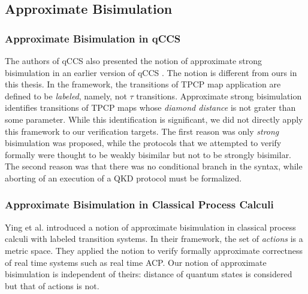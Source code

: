 \subsection{Approximate Bisimulation}
\subsubsection{Approximate Bisimulation in qCCS}
The authors of qCCS also presented the notion of approximate
strong bisimulation in an earlier version of qCCS \cite{Ying2009}.
The notion is different from ours in this thesis.
In the framework, the transitions of TPCP map application are
defined to be {\it labeled}, namely, not $\tau$ transitions.
Approximate strong bisimulation identifies transitions of TPCP maps
whose {\it diamond distance} is not grater than some parameter.
While this identification is significant,
we did not directly apply this framework to our verification targets.
The first reason was only {\it strong} bisimulation was proposed,
while the protocols that we attempted to verify formally were thought
to be weakly bisimilar but not to be strongly bisimilar.
The second reason was that there was no conditional branch in the syntax,
while aborting of an execution of a QKD protocol must be formalized.

\subsubsection{Approximate Bisimulation in Classical Process Calculi}
Ying et al. introduced a notion of approximate bisimulation in
classical process calculi \cite{Ying2000} with labeled transition
systems. In their framework, the set of \emph{actions} is a metric space.
They applied the notion to verify formally 
approximate correctness of real time
systems such as real time ACP. Our notion of approximate bisimulation is
independent of theirs: distance of quantum states is considered but
that of actions is not.

